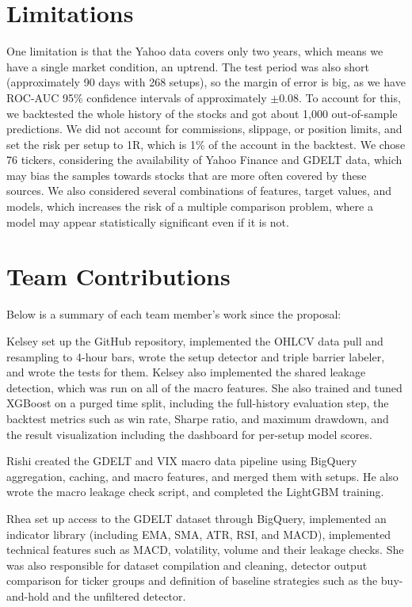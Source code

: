 \documentclass[11pt]{article}
\begin{document}
\section*{Limitations}

One limitation is that the Yahoo data covers only two years, which means we have a single market condition, an uptrend. The test period was also short (approximately 90 days with 268 setups), so the margin of error is big, as we have ROC-AUC 95\% confidence intervals of approximately $\pm$0.08. To account for this, we backtested the whole history of the stocks and got about 1,000 out-of-sample predictions. We did not account for commissions, slippage, or position limits, and set the risk per setup to 1R, which is 1\% of the account in the backtest. We chose 76 tickers, considering the availability of Yahoo Finance and GDELT data, which may bias the samples towards stocks that are more often covered by these sources. We also considered several combinations of features, target values, and models, which increases the risk of a multiple comparison problem, where a model may appear statistically significant even if it is not.

\section*{Team Contributions}

Below is a summary of each team member's work since the proposal:

Kelsey set up the GitHub repository, implemented the OHLCV data pull and resampling to 4-hour bars, wrote the setup detector and triple barrier labeler, and wrote the tests for them. Kelsey also implemented the shared leakage detection, which was run on all of the macro features. She also trained and tuned XGBoost on a purged time split, including the full-history evaluation step, the backtest metrics such as win rate, Sharpe ratio, and maximum drawdown, and the result visualization including the dashboard for per-setup model scores.

Rishi created the GDELT and VIX macro data pipeline using BigQuery aggregation, caching, and macro features, and merged them with setups. He also wrote the macro leakage check script, and completed the LightGBM training.

Rhea set up access to the GDELT dataset through BigQuery, implemented an indicator library (including EMA, SMA, ATR, RSI, and MACD), implemented technical features such as MACD, volatility, volume and their leakage checks. She was also responsible for dataset compilation and cleaning, detector output comparison for ticker groups and definition of baseline strategies such as the buy-and-hold and the unfiltered detector.
\end{document}
